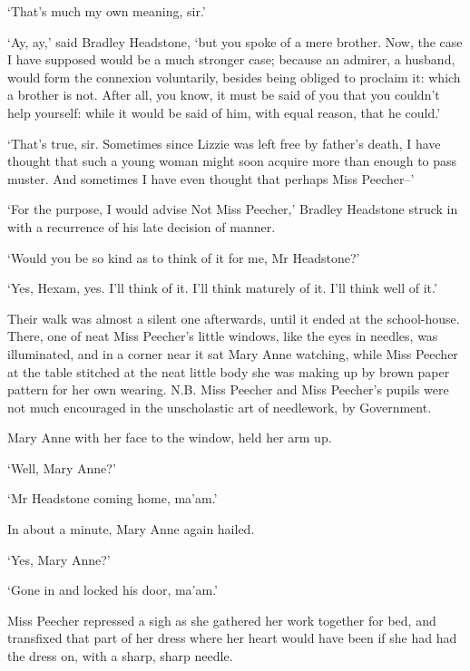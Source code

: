 ‘That’s much my own meaning, sir.’

‘Ay, ay,’ said Bradley Headstone, ‘but you spoke of a mere brother.
Now, the case I have supposed would be a much stronger case; because an
admirer, a husband, would form the connexion voluntarily, besides being
obliged to proclaim it: which a brother is not. After all, you know, it
must be said of you that you couldn’t help yourself: while it would be
said of him, with equal reason, that he could.’

‘That’s true, sir. Sometimes since Lizzie was left free by father’s
death, I have thought that such a young woman might soon acquire more
than enough to pass muster. And sometimes I have even thought that
perhaps Miss Peecher--’

‘For the purpose, I would advise Not Miss Peecher,’ Bradley Headstone
struck in with a recurrence of his late decision of manner.

‘Would you be so kind as to think of it for me, Mr Headstone?’

‘Yes, Hexam, yes. I’ll think of it. I’ll think maturely of it. I’ll
think well of it.’

Their walk was almost a silent one afterwards, until it ended at the
school-house. There, one of neat Miss Peecher’s little windows, like the
eyes in needles, was illuminated, and in a corner near it sat Mary Anne
watching, while Miss Peecher at the table stitched at the neat little
body she was making up by brown paper pattern for her own wearing. N.B.
Miss Peecher and Miss Peecher’s pupils were not much encouraged in the
unscholastic art of needlework, by Government.

Mary Anne with her face to the window, held her arm up.

‘Well, Mary Anne?’

‘Mr Headstone coming home, ma’am.’

In about a minute, Mary Anne again hailed.

‘Yes, Mary Anne?’

‘Gone in and locked his door, ma’am.’

Miss Peecher repressed a sigh as she gathered her work together for bed,
and transfixed that part of her dress where her heart would have been if
she had had the dress on, with a sharp, sharp needle.



